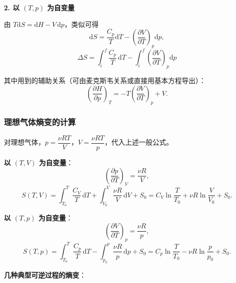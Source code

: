 \documentclass[UTF8]{ctexart}
\theoremstyle{definition}
\begin{document}
\textbf{2. 以 $(T,p)$ 为自变量}

由 $T\mathrm{d}S=\mathrm{d}H-V\,\mathrm{d}p$，类似可得
\begin{equation}
\mathrm{d}S=\frac{C_p}{T}\mathrm{d}T-\left(\frac{\partial V}{\partial T}\right)_p\mathrm{d}p,
\end{equation}
\begin{equation}
\boxed{\Delta S=\int_i^f\frac{C_p}{T}\,\mathrm{d}T-\int_i^f\left(\frac{\partial V}{\partial T}\right)_p\mathrm{d}p}
\end{equation}

其中用到的辅助关系（可由麦克斯韦关系或直接用基本方程导出）：
\begin{equation}
\left(\frac{\partial H}{\partial p}\right)_T=-T\left(\frac{\partial V}{\partial T}\right)_p+V.
\end{equation}

\subsubsection*{理想气体熵变的计算}

对理想气体，$p=\dfrac{\nu RT}{V}$，$V=\dfrac{\nu RT}{p}$，代入上述一般公式。

\textbf{以 $(T,V)$ 为自变量}：
\begin{equation}
\left(\frac{\partial p}{\partial T}\right)_V=\frac{\nu R}{V},
\end{equation}
\begin{equation}
S(T,V)=\int_{T_0}^{T}\frac{C_V}{T}\,\mathrm{d}T+\int_{V_0}^{V}\frac{\nu R}{V}\,\mathrm{d}V+S_0
=C_V\ln\frac{T}{T_0}+\nu R\ln\frac{V}{V_0}+S_0.
\end{equation}

\textbf{以 $(T,p)$ 为自变量}：
\begin{equation}
\left(\frac{\partial V}{\partial T}\right)_p=\frac{\nu R}{p},
\end{equation}
\begin{equation}
S(T,p)=\int_{T_0}^{T}\frac{C_p}{T}\,\mathrm{d}T-\int_{p_0}^{p}\frac{\nu R}{p}\,\mathrm{d}p+S_0
=C_p\ln\frac{T}{T_0}-\nu R\ln\frac{p}{p_0}+S_0.
\end{equation}

\textbf{几种典型可逆过程的熵变}：
\end{document}
